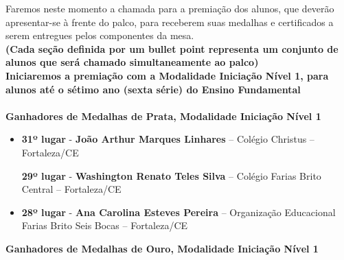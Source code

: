 \documentclass{article}
\begin{document}
Faremos neste momento a chamada para a premiação dos alunos, que deverão apresentar-se à frente do palco, para receberem suas medalhas e certificados a serem entregues pelos componentes da mesa.\\
\color{red}\textbf{(Cada seção definida por um bullet point representa um conjunto de alunos que será chamado simultaneamente ao palco)}\color{black}\\

\color{blue}
\textbf{Iniciaremos a premiação com a Modalidade Iniciação Nível 1, para alunos até o sétimo ano (sexta série) do Ensino Fundamental}\\\\
\textbf{\color{blue}Ganhadores de Medalhas de Prata, \color{black}Modalidade Iniciação Nível 1}
\color{black}

\begin{itemize}
\item
\textbf{31º lugar} - \textbf{João Arthur Marques Linhares} – Colégio Christus – Fortaleza/CE


\textbf{29º lugar} - \textbf{Washington Renato Teles Silva} – Colégio Farias Brito Central – Fortaleza/CE



\item
\textbf{28º lugar} - \textbf{Ana Carolina Esteves Pereira} – Organização Educacional Farias Brito Seis Bocas – Fortaleza/CE



\end{itemize}

\textbf{\color{blue}Ganhadores de Medalhas de Ouro, \color{black}Modalidade Iniciação Nível 1}
\color{black}
\end{document}
